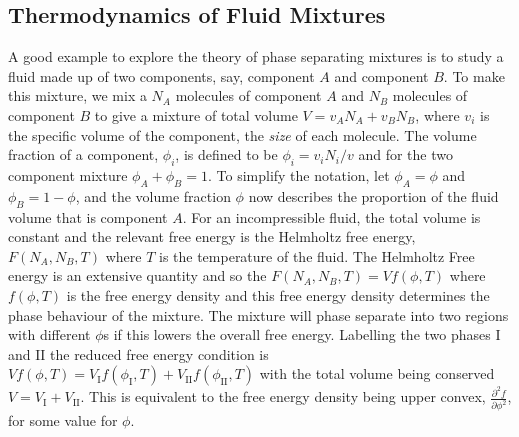 \subsection{Thermodynamics of Fluid Mixtures}

A good example to explore the theory of phase separating mixtures is to study a fluid made up of two components, say, component $A$ and component $B$. To make this mixture, we mix a $N_A$ molecules of component $A$ and $N_B$ molecules of component $B$ to give a mixture of total volume $V = v_A N_A + v_B N_B$, where $v_i$ is the specific volume of the component, the \textit{size} of each molecule. The volume fraction of a component, $\phi_i$, is defined to be $\phi_i = v_i N_i/v$ and for the two component mixture $\phi_A+\phi_B = 1$. To simplify the notation, let $\phi_A=\phi$ and $\phi_B=1-\phi$, and the volume fraction $\phi$ now describes the proportion of the fluid volume that is component $A$. For an incompressible fluid, the total volume is constant and the relevant free energy is the Helmholtz free energy, $F(N_A, N_B, T)$ where $T$ is the temperature of the fluid. The Helmholtz Free energy is an extensive quantity and so the $F(N_A, N_B, T) = V f(\phi, T)$ where $f(\phi, T)$ is the free energy density and this free energy density determines the phase behaviour of the mixture. The mixture will phase separate into two regions with different $\phi$s if this lowers the overall free energy. Labelling the two phases $\mathrm{I}$ and $\mathrm{II}$ the reduced free energy condition is $Vf(\phi, T) = V_{\mathrm{I}} f(\phi_{\mathrm{I}}, T)+ V_{\mathrm{II}} f(\phi_{\mathrm{II}}, T)$ with the total volume being conserved $V = V_{\mathrm{I}}+V_{\mathrm{II}}$. This is equivalent to the free energy density being upper convex, $\frac{\partial^2 f}{\partial \phi^2}$, for some value for $\phi$.

